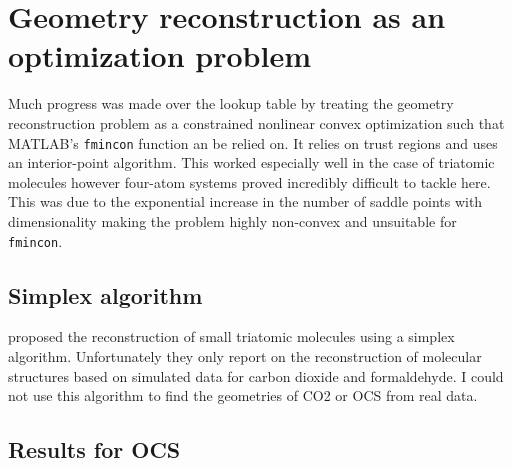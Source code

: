 \chapter{Geometry reconstruction as an optimization problem}\label{ch:optimization}

Much progress was made over the lookup table by treating the geometry reconstruction problem as a constrained nonlinear convex optimization such that MATLAB's \texttt{fmincon} function an be relied on. It relies on trust regions and uses an interior-point algorithm. This worked especially well in the case of triatomic molecules however four-atom systems proved incredibly difficult to tackle here. This was due to the exponential increase in the number of saddle points with dimensionality  making the problem highly non-convex and unsuitable for \texttt{fmincon}.

\section{Simplex algorithm}

\citet{Brichta09} proposed the reconstruction of small triatomic molecules using a simplex algorithm. Unfortunately they only report on the reconstruction of molecular structures based on simulated data for carbon dioxide and formaldehyde. I could not use this algorithm to find the geometries of CO2 or OCS from real data.

\section{Results for OCS}